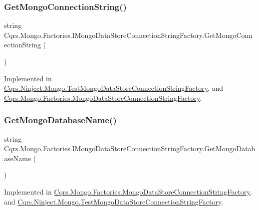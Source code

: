 \subsubsection{\texorpdfstring{Get\+Mongo\+Connection\+String()}{GetMongoConnectionString()}}
{\footnotesize\ttfamily string Cqrs.\+Mongo.\+Factories.\+I\+Mongo\+Data\+Store\+Connection\+String\+Factory.\+Get\+Mongo\+Connection\+String (\begin{DoxyParamCaption}{ }\end{DoxyParamCaption})}



Implemented in \hyperlink{classCqrs_1_1Ninject_1_1Mongo_1_1TestMongoDataStoreConnectionStringFactory_ae23b67139698984823fa7c250dcca47a_ae23b67139698984823fa7c250dcca47a}{Cqrs.\+Ninject.\+Mongo.\+Test\+Mongo\+Data\+Store\+Connection\+String\+Factory}, and \hyperlink{classCqrs_1_1Mongo_1_1Factories_1_1MongoDataStoreConnectionStringFactory_a33064b1b1cbf06ef4f9e12371c7ef785_a33064b1b1cbf06ef4f9e12371c7ef785}{Cqrs.\+Mongo.\+Factories.\+Mongo\+Data\+Store\+Connection\+String\+Factory}.

\mbox{\label{interfaceCqrs_1_1Mongo_1_1Factories_1_1IMongoDataStoreConnectionStringFactory_a90de27c2bf23d7f9412d55c09ab2ec8c_a90de27c2bf23d7f9412d55c09ab2ec8c}} 
\subsubsection{\texorpdfstring{Get\+Mongo\+Database\+Name()}{GetMongoDatabaseName()}}
{\footnotesize\ttfamily string Cqrs.\+Mongo.\+Factories.\+I\+Mongo\+Data\+Store\+Connection\+String\+Factory.\+Get\+Mongo\+Database\+Name (\begin{DoxyParamCaption}{ }\end{DoxyParamCaption})}



Implemented in \hyperlink{classCqrs_1_1Mongo_1_1Factories_1_1MongoDataStoreConnectionStringFactory_a7f330359f2db5b86ad28ac7d8a4c49f1_a7f330359f2db5b86ad28ac7d8a4c49f1}{Cqrs.\+Mongo.\+Factories.\+Mongo\+Data\+Store\+Connection\+String\+Factory}, and \hyperlink{classCqrs_1_1Ninject_1_1Mongo_1_1TestMongoDataStoreConnectionStringFactory_ac638a5771711c1d0746ee0ec55c5e192_ac638a5771711c1d0746ee0ec55c5e192}{Cqrs.\+Ninject.\+Mongo.\+Test\+Mongo\+Data\+Store\+Connection\+String\+Factory}.

